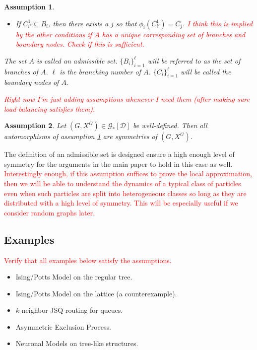 \documentclass[12pt]{article}
\newcommand{\mc}{\mathcal}
\newcommand{\tr}{\textcolor{red}}
\newcommand{\ind}{\hspace{24pt}}
\newcommand{\cad}{\mc{D}}							%
\newcommand{\indx}[1]{^{#1}}						%
\newcommand{\Xf}{X}									%
\newcommand{\gind}[1]{^{#1}}						%
\newcommand{\psize}{\ell}							%
\newcommand{\Gs}{\mc{G}_\ast}						%
\renewcommand{\sp}[1]{[#1]}							%
\newtheorem{assu}{Assumption}
\begin{document}
\begin{assu}
\begin{itemize}
\item If \(C\indx{1}_{i'} \subseteq B_i\), then there exists a \(j\) so that \(\phi_i(C\indx{1}_{i'}) = C_j\). \tr{I think this is implied by the other conditions if \(A\) has a unique corresponding set of branches and boundary nodes. Check if this is sufficient.}
\end{itemize}

The set \(A\) is called an admissible set. \(\{B_i\}_{i=1}^\psize\) will be referred to as the set of branches of \(A\). \(\psize\) is the branching number of \(A\). \(\{C_i\}_{i=1}^\psize\) will be called the boundary nodes of \(A\).

\ind \tr{Right now I'm just adding assumptions whenever I need them (after making sure load-balancing satisfies them).}
\label{a::admissible}
\end{assu}

\begin{assu}
Let \((G,\Xf\gind{G}) \in \Gs\sp{\cad}\) be well-defined. Then all automorphisms of assumption \ref{a::admissible} are symmetries of \((G,\Xf\gind{G})\).
\label{a::padmin}
\end{assu}

The definition of an admissible set is designed ensure a high enough level of symmetry for the arguments in the main paper to hold in this case as well. \tr{Interestingly enough, if this assumption suffices to prove the local approximation, then we will be able to understand the dynamics of a typical class of particles even when such particles are split into heterogeneous classes so long as they are distributed with a high level of symmetry. This will be especially useful if we consider random graphs later.}

\subsection{Examples}
\label{e::not}

\tr{Verify that all examples below satisfy the assumptions. }

\begin{itemize}
\item Ising/Potts Model on the regular tree.

\item Ising/Potts Model on the lattice (a counterexample).

\item \(k\)-neighbor JSQ routing for queues.

\item Asymmetric Exclusion Process.

\item Neuronal Models on tree-like structures.
\end{itemize}
\end{document}
